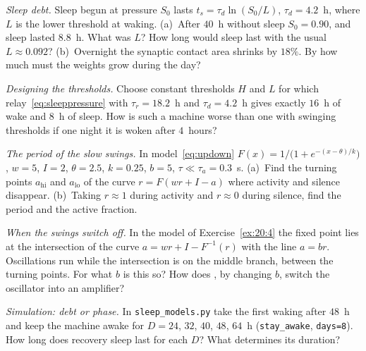\begin{exercise}[\lvlA]
\label{ex:20:2}
\emph{Sleep debt.} Sleep begun at pressure $S_0$ lasts $t_s=\tau_d\ln(S_0/L)$, $\tau_d=4.2$~h, where $L$ is the lower threshold at waking. (a)~After $40$~h without sleep $S_0=0.90$, and sleep lasted $8.8$~h. What was $L$? How long would sleep last with the usual $L\approx0.092$? (b)~Overnight the synaptic contact area shrinks by $18\%$. By how much must the weights grow during the day?
\end{exercise}

\begin{exercise}[\lvlB]
\label{ex:20:3}
\emph{Designing the thresholds.} Choose constant thresholds $H$ and $L$ for which relay~\eqref{eq:sleeppressure} with $\tau_r=18.2$~h and $\tau_d=4.2$~h gives exactly $16$~h of wake and $8$~h of sleep. How is such a machine worse than one with swinging thresholds if one night it is woken after $4$~hours?
\end{exercise}

\begin{exercise}[\lvlB]
\label{ex:20:4}
\emph{The period of the slow swings.} In model~\eqref{eq:updown} $F(x)=1/\bigl(1+e^{-(x-\theta)/k}\bigr)$, $w=5$, $I=2$, $\theta=2.5$, $k=0.25$, $b=5$, $\tau\ll\tau_a=0.3$~s. (a)~Find the turning points $a_{\text{hi}}$ and $a_{\text{lo}}$ of the curve $r=F(wr+I-a)$ where activity and silence disappear. (b)~Taking $r\approx1$ during activity and $r\approx0$ during silence, find the period and the active fraction.
\end{exercise}

\begin{exercise}[\lvlB]
\label{ex:20:5}
\emph{When the swings switch off.} In the model of Exercise~\ref{ex:20:4} the fixed point lies at the intersection of the curve $a=wr+I-F^{-1}(r)$ with the line $a=br$. Oscillations run while the intersection is on the middle branch, between the turning points. For what $b$ is this so? How does , by changing $b$, switch the oscillator into an amplifier?
\end{exercise}

\begin{exercise}[\lvlB]
\label{ex:20:6}
\emph{Simulation: debt or phase.} In \texttt{sleep\_models.py} take the first waking after $48$~h and keep the machine awake for $D=24$, $32$, $40$, $48$, $64$~h (\texttt{stay\_awake}, \texttt{days=8}). How long does recovery sleep last for each $D$? What determines its duration?
\end{exercise}


